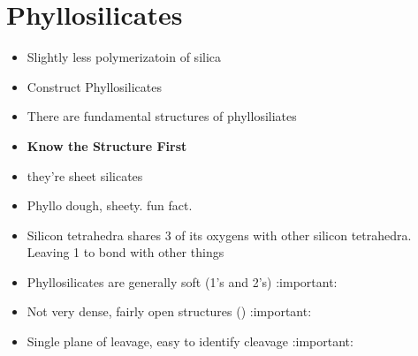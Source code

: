 \documentclass[11pt]{article}
\begin{document}
\section{Phyllosilicates}
\label{sec-3}
\begin{itemize}
\item Slightly less polymerizatoin of silica
\item Construct Phyllosilicates
\item There are fundamental structures of phyllosiliates
\item \textbf{Know the Structure First}
\item they're sheet silicates
\item Phyllo dough, sheety. fun fact.
\item Silicon tetrahedra shares 3 of its oxygens with other silicon tetrahedra. Leaving 1 to bond with other things
\item Phyllosilicates are generally soft (1's and 2's) :important:
\item Not very dense, fairly open structures () :important:
\item Single plane of leavage, easy to identify cleavage :important:
\end{itemize}
\end{document}
